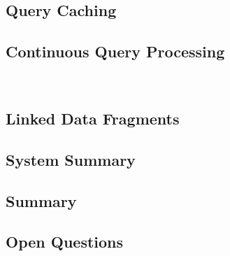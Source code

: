 \documentclass[sw]{iosart2x}
\begin{document}
\subsection{Query Caching}\label{Caching}


\subsection{Continuous Query Processing}\label{Streams}

~\cite{DehghanzadehDGV15}

\subsection{Linked Data Fragments}\label{Fragments}
\subsection{System Summary}\label{System4}
\subsection{Summary}\label{Summary4}
\subsection{Open Questions}\label{Open4}














\end{document}
